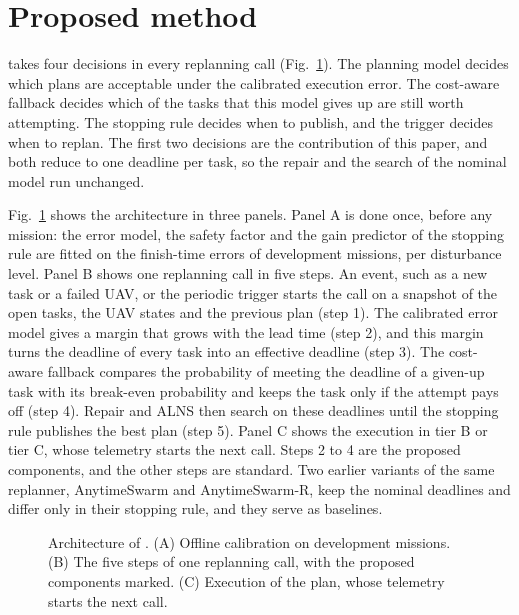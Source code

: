\section{Proposed method}\label{sec:method}
\mname{} takes four decisions in every replanning call (Fig.~\ref{fig:overview}). The planning model decides which
plans are acceptable under the calibrated execution error. The cost-aware fallback decides which of the tasks that this
model gives up are still worth attempting. The stopping rule decides when to publish, and the trigger decides when to
replan. The first two decisions are the contribution of this paper, and both reduce to one deadline per task, so the
repair and the search of the nominal model run unchanged.

Fig.~\ref{fig:overview} shows the architecture in three panels. Panel A is done once, before any mission: the error
model, the safety factor and the gain predictor of the stopping rule are fitted on the finish-time errors of
development missions, per disturbance level. Panel B shows one replanning call in five steps. An event, such as a new
task or a failed UAV, or the periodic trigger starts the call on a snapshot of the open tasks, the UAV states and the
previous plan (step 1). The calibrated error model gives a margin that grows with the lead time (step 2), and this
margin turns the deadline of every task into an effective deadline (step 3). The cost-aware fallback compares the
probability of meeting the deadline of a given-up task with its break-even probability and keeps the task only if the
attempt pays off (step 4). Repair and ALNS then search on these deadlines until the stopping rule publishes the best
plan (step 5). Panel C shows the execution in tier B or tier C, whose telemetry starts the next call. Steps 2 to 4 are
the proposed components, and the other steps are standard. Two earlier variants of the same replanner, AnytimeSwarm and
AnytimeSwarm-R, keep the nominal deadlines and differ only in their stopping rule, and they serve as baselines.

\begin{figure}[t]
\centering
{}
\caption{Architecture of \mname{}. (A) Offline calibration on development missions. (B) The five steps of one
replanning call, with the proposed components marked. (C) Execution of the plan, whose telemetry starts the next
call.}\label{fig:overview}
\end{figure}

